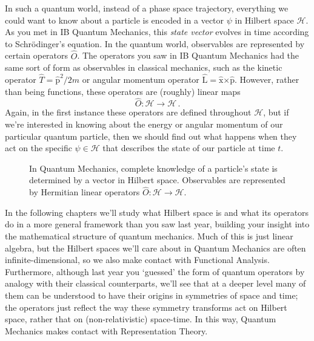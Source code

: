 \documentclass{article}
\theoremstyle{plain}\theoremheaderfont{\normalfont\itshape}\theorembodyfont{\rmfamily}\theoremseparator{.}\newtheorem*{rem}{Remark}\newtheorem*{ex}{Example}\newtheorem*{proof}{Proof}\newtheorem*{altp}{Alternative proof}
\theoremstyle{plain}\theoremheaderfont{\normalfont\bfseries}\theorembodyfont{\rmfamily}\theoremseparator{.}\newtheorem{thm}{Theorem}[section]\newtheorem{lem}[thm]{Lemma}\newtheorem{prop}[thm]{Proposition}\newtheorem*{cor}{Corollary}\newtheorem{defn}[thm]{Definition}\newtheorem{clm}[thm]{Claim}\newtheorem{clminproof}{Claim}
\theoremstyle{break}\theoremheaderfont{\normalfont\itshape}\theorembodyfont{\rmfamily}\theoremseparator{.\medskip}\newtheorem*{proofskip}{Proof}\newtheorem*{exs}{Examples}\newtheorem*{rems}{Remarks}
\theoremstyle{break}\theoremheaderfont{\normalfont\bfseries}\theorembodyfont{\rmfamily}\theoremseparator{.\medskip}\newtheorem{lemskip}[thm]{Lemma}\newtheorem{defnskip}[thm]{Definition}\newtheorem{propskip}[thm]{Proposition}\newtheorem{thmskip}[thm]{Theorem}
\numberwithin{equation}{section}
\newcommand{\vb}[1]{\bm{\mathrm{#1}}}
\newcommand{\cross}{\bm{\times}}
\newcommand{\hb}{\mathcal{H}}
\begin{document}
    In such a quantum world, instead of a phase space trajectory, everything we could want to know about a particle is encoded in a vector \(\psi\) in Hilbert space \(\hb\). As you met in IB Quantum Mechanics, this \textit{state vector} evolves in time according to Schr\"{o}dinger's equation. In the quantum world, observables are represented by certain operators \(\hat{O}\). The operators you saw in IB Quantum Mechanics had the same sort of form as observables in classical mechanics, such as the kinetic operator \(\hat{T}=\hat{\vb{p}}^2/2m\) or angular momentum operator \(\hat{\vb{L}}=\hat{\vb{x}}\cross\hat{\vb{p}}\). However, rather than being functions, these operators are (roughly) linear maps
    \begin{equation}
        \hat{O}:\hb\longrightarrow\hb\,.
    \end{equation}
    Again, in the first instance these operators are defined throughout \(\hb\), but if we're interested in knowing about the energy or angular momentum of our particular quantum particle, then we should find out what happens when they act on the specific \(\psi\in\hb\) that describes the state of our particle at time \(t\).

    \begin{figure}
        \centering

        \caption{In Quantum Mechanics, complete knowledge of a particle's state is determined by a vector in Hilbert space. Observables are represented by Hermitian linear operators \(\hat{O}:\hb\to\hb\).}
    \end{figure}

    In the following chapters we'll study what Hilbert space is and what its operators do in a more general framework than you saw last year, building your insight into the mathematical structure of quantum mechanics. Much of this is just linear algebra, but the Hilbert spaces we'll care about in Quantum Mechanics are often infinite-dimensional, so we also make contact with Functional Analysis. Furthermore, although last year you `guessed' the form of quantum operators by analogy with their classical counterparts, we'll see that at a deeper level many of them can be understood to have their origins in symmetries of space and time; the operators just reflect the way these symmetry transforms act on Hilbert space, rather that on (non-relativistic) space-time. In this way, Quantum Mechanics makes contact with Representation Theory.
\end{document}
